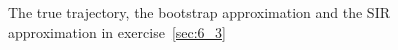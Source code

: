 \documentclass[a4paper,oneside,article]{memoir}
\begin{document}
\begin{figure}[htb]
  \begin{adjustwidth}{-2in}{-2in}
	  \centering
  \end{adjustwidth}
  	  \caption{The true trajectory, the bootstrap approximation and the SIR approximation in exercise~\ref{sec:6_3}}
	  \label{fig:ex_6_3}
\end{figure}
\clearpage


\end{document}
